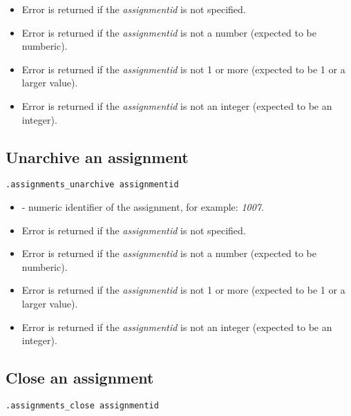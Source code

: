 \errheader
\begin{itemize}
    \item Error  is returned if the \textit{assignmentid} is not specified.
    \item Error  is returned if the \textit{assignmentid} is not a number (expected to be numberic).
    \item Error  is returned if the \textit{assignmentid} is not 1 or more (expected to be 1 or a larger value).
    \item Error  is returned if the \textit{assignmentid} is not an integer (expected to be an integer).
\end{itemize}



\subsection{Unarchive an assignment}

\begin{lstlisting}[style=CommandLineStyle]
.assignments_unarchive assignmentid
\end{lstlisting}

\paramsheader
\begin{itemize}
    \item {} - numeric identifier of the assignment, for example: \textit{1007}.
\end{itemize}

\errheader
\begin{itemize}
    \item Error  is returned if the \textit{assignmentid} is not specified.
    \item Error  is returned if the \textit{assignmentid} is not a number (expected to be numberic).
    \item Error  is returned if the \textit{assignmentid} is not 1 or more (expected to be 1 or a larger value).
    \item Error  is returned if the \textit{assignmentid} is not an integer (expected to be an integer).
\end{itemize}


\subsection{Close an assignment}

\begin{lstlisting}[style=CommandLineStyle]
.assignments_close assignmentid
\end{lstlisting}

